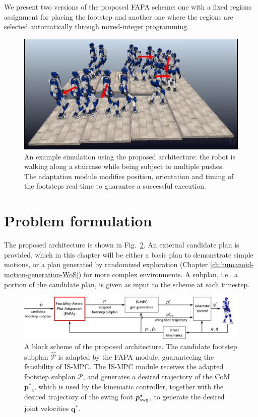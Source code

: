 We present two versions of the proposed FAPA scheme: one with a fixed regions
assignment for placing the footstep and another one where the regions are
selected automatically through mixed-integer programming.

\begin{figure}
    \centering
    \includegraphics[trim={0.5cm 1.5cm 2cm 0.1cm},clip,width=0.9\columnwidth]{figures/strobo-staircase-with-pushes-2.png}
    \caption{An example simulation using the proposed architecture: the robot is walking along a staircase while being subject to multiple pushes. The adaptation module modifies position, orientation and timing of the footsteps real-time to guarantee a successful execution.}
    \label{fig:FAPA:two-patches-mixed-integer-snapshots}
\end{figure}

\section{Problem formulation} 
\label{sec:FAPA:ProblemFormulation}
The proposed architecture is shown in Fig.~\ref{fig:FAPA:block_scheme}.
An external candidate plan is provided, which in this chapter will be either
a basic plan to demonstrate simple motions, or a plan generated by randomized
exploration (Chapter \ref{ch:humanoid-motion-generation-WoS})
for more complex environments.
A subplan, i.e., a portion of the candidate plan, is given as input to the
scheme at each timestep.

\begin{figure}
    \centering\includegraphics[width=\textwidth]{figures/BlockScheme-NLP-STA.pdf}
    \caption{A block scheme of the proposed architecture. The candidate footstep subplan $\mathcal{\hat{P}}$ is adapted by the FAPA module, guaranteeing the feasibility of IS-MPC. The IS-MPC module receives the adapted footstep subplan $\mathcal{P}$, and generates a desired trajectory of the CoM $\bm{p^*}_c$, which is used by the kinematic controller, together with the desired trajectory of the swing foot $\bm{p^*}_{\rm swg}$, to generate the desired joint velocities $\dot{\bm{q^*}}$.}
    \label{fig:FAPA:block_scheme}
    \end{figure}

